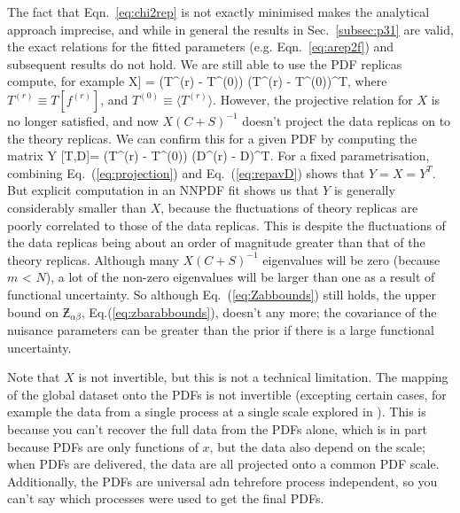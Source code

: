 The fact that Eqn.~\ref{eq:chi2rep} is not exactly minimised makes the analytical approach imprecise, and while in general the results in Sec.~\ref{subsec:p31} are valid, the exact relations for the fitted parameters (e.g. Eqn.~\ref{eq:arep2f}) and subsequent results do not hold. We are still able to use the PDF replicas compute, for example
\be
X\equiv\Cov[T[f]] = \langle (T^{(r)} - T^{(0)}) (T^{(r)} - T^{(0)})^T\rangle,
\label{eq:Xdefgen}
\ee
where $T^{(r)}\equiv T[f^{(r)}]$, and $T^{(0)}\equiv \langle T^{(r)}\rangle$. However, the projective relation for $X$ is no longer satisfied, and now $X(C+S)^{-1}$ doesn't project the data replicas on to the theory replicas. We can confirm this for a given PDF by computing the matrix
\be
Y [T,D]= \langle (T^{(r)} - T^{(0)}) (D^{(r)} - D)^T\rangle.
\label{eq:YdefNN}
\ee
For a fixed parametrisation, combining Eq.~(\ref{eq:projection}) and Eq.~(\ref{eq:repavD}) shows that $Y=X=Y^T$. But explicit computation in an NNPDF fit shows us that $Y$ is generally considerably smaller than $X$, because the fluctuations of theory replicas are poorly correlated to those of the data replicas. This is despite the fluctuations of the data replicas being about an order of magnitude greater than that of the theory replicas. Although many $X(C+S)^{-1}$ eigenvalues will be zero (because $m$ < $N$), a lot of the non-zero eigenvalues will be larger than one as a result of functional uncertainty. So although Eq.~(\ref{eq:Zabbounds}) still holds, the upper bound on $\Zbar_{\alpha\beta}$, Eq.(\ref{eq:zbarabbounds}), doesn't any more; the covariance of the nuisance parameters can be greater than the prior if there is a large functional uncertainty. 

Note that $X$ is not invertible, but this is not a technical limitation. The mapping of the global dataset onto the PDFs is not invertible (excepting certain cases, for example the data from a single process at a single scale explored in \cite{Harland-Lang:2018bxd}). This is because you can't recover the full data from the PDFs alone, which is in part because PDFs are only functions of $x$, but the data also depend on the scale; when PDFs are delivered, the data are all projected onto a common PDF scale. Additionally, the PDFs are universal adn tehrefore process independent, so you can't say which processes were used to get the final PDFs. 

